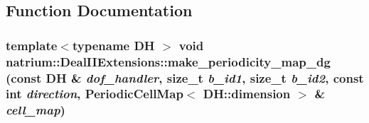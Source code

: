 \subsection{Function Documentation}
\hypertarget{namespacenatrium_1_1DealIIExtensions_a01f414566020f59f29036fd7e22341b9}{
\subsubsection[{make\_\-periodicity\_\-map\_\-dg}]{\setlength{\rightskip}{0pt plus 5cm}template$<$typename DH $>$ void natrium::DealIIExtensions::make\_\-periodicity\_\-map\_\-dg (const DH \& {\em dof\_\-handler}, \/  size\_\-t {\em b\_\-id1}, \/  size\_\-t {\em b\_\-id2}, \/  const int {\em direction}, \/  PeriodicCellMap$<$ DH::dimension $>$ \& {\em cell\_\-map})}}
\label{namespacenatrium_1_1DealIIExtensions_a01f414566020f59f29036fd7e22341b9}


